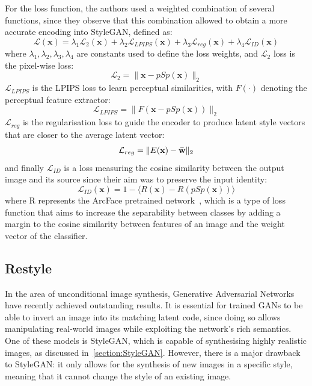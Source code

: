 \noindent For the loss function, the authors used a weighted combination of several functions, since they observe that this combination allowed to obtain a more accurate encoding into StyleGAN, defined as: 
\begin{equation}
    \label{eq:pSpTotalLoss}
    \mathcal{L}(\mathbf{x}) = \lambda_1 \mathcal{L}_2(\mathbf{x}) + \lambda_2 \mathcal{L}_{LPIPS}(\mathbf{x}) + \lambda_3\mathcal{L}_{reg}(\mathbf{x}) + \lambda_4\mathcal{L}_{ID}(\mathbf{x})
\end{equation}
where $\lambda_1,\lambda_2,\lambda_3,\lambda_4$ are constants used to define the loss weights, and $\mathcal{L}_2$ loss is the pixel-wise loss:
\begin{equation}
    \label{eq:l2Loss}
    \mathcal{L}_2 =  \| \mathbf{x} - pSp(\mathbf{x})  \|_2
\end{equation}
 $\mathcal{L}_{LPIPS}$ is the LPIPS loss to learn perceptual similarities, with $F(\cdot)$ denoting the perceptual feature extractor:
\begin{equation}
    \label{eq:lpips-loss}
    \mathcal{L}_{LPIPS} = \| F(\mathbf{x} - pSp(\mathbf{x})) \|_2
\end{equation}
$ \mathcal{L}_{reg}$ is the regularisation loss to guide the encoder to produce latent style vectors that are closer to the average latent vector:
\begin{equation}
    \label{eq:regularizationLoss-psp}
    \mathcal{L}_{reg} = \| E(\mathbf{x}) - \mathbf{\Bar{w}}\| _2
\end{equation}
and finally $ \mathcal{L}_{ID}$ is a loss measuring the cosine similarity between the output image and its source since their aim was to preserve the input identity:
\begin{equation}
    \label{eq:identityLoss}
    \mathcal{L}_{ID}(\mathbf{x}) = 1 - \langle R(\mathbf{x}) - R(pSp(\mathbf{x}))\rangle
\end{equation}
where R represents the ArcFace pretrained network~\cite{arcface2018}, which is a type of loss function that aims to increase the separability between classes by adding a margin to the cosine similarity between features of an image and the weight vector of the classifier.
%
%
%
\subsection{Restyle}
\label{section:restyle}
In the area of unconditional image synthesis, Generative Adversarial Networks have recently achieved outstanding results. 
It is essential for trained GANs to be able to invert an image into its matching latent code, since doing so allows manipulating real-world images while exploiting the network's rich semantics.
One of these models is StyleGAN, which is capable of synthesising highly realistic images, as discussed in~\ref{section:StyleGAN}. However, there is a major drawback to StyleGAN: it only allows for the synthesis of new images in a specific style, meaning that it cannot change the style of an existing image.

